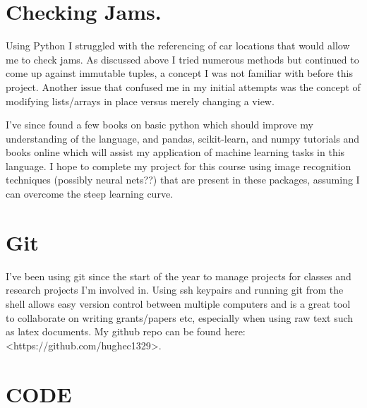 \documentclass[12pt]{article}
\begin{document}
	\section{Checking Jams.}
		Using Python I struggled with the referencing of car locations that would allow me to check jams. As discussed above I tried numerous methods but continued to come up against immutable tuples, a concept I was not familiar with before this project. 
		Another issue that confused me in my initial attempts was the concept of modifying lists/arrays in place versus merely changing a view. 


		I've since found a few books on basic python which should improve my understanding of the language, and pandas, scikit-learn, and numpy tutorials and books online which will assist my application of machine learning tasks in this language. 
		I hope to complete my project for this course using image recognition techniques (possibly neural nets??) that are present in these packages, assuming I can overcome the steep learning curve.

	\section{Git}
		I've been using git since the start of the year to manage projects for classes and research projects I'm involved in.
		Using ssh keypairs and running git from the shell allows easy version control between multiple computers and is a great tool to collaborate on writing grants/papers etc, especially when using raw text such as latex documents.
		My github repo can be found here: <https://github.com/hughec1329>.

\newpage
	\section{CODE}
		
\end{document}
